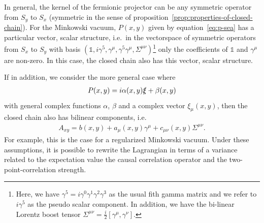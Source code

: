 \documentclass[reqno,11pt]{amsart}
\numberwithin{equation}{section}
\begin{document}
In general, the kernel of the fermionic projector can be any symmetric operator from $S_y$ to $S_x$ (symmetric in the sense of
proposition~\ref{prop:properties-of-closed-chain}).
For the Minkowski vacuum, $P(x, y)$ given by equation~\eqref{eq:p-sea} has a particular vector, scalar structure,
i.e.~in the vectorspace of symmetric operators from $S_x$ to $S_y$ with basis $(\mathbb{1}, i \gamma^5, \gamma^\mu, \gamma^5 \gamma^\mu, \Sigma^{\mu\nu})$\footnote{
    Here, we have $\gamma^5 = i \gamma^0 \gamma^1 \gamma^2 \gamma^3$ as the usual fith gamma matrix and we refer to $i \gamma^5$
    as the pseudo scalar component.
    In addition, we have the bi-linear Lorentz boost tensor $\Sigma^{\mu\nu} = \frac{i}{2} \left[ \gamma^\mu, \gamma^\nu \right]$.
}
only the coefficients of $\mathbb{1}$ and $\gamma^\mu$ are non-zero.
In this case, the closed chain also has this vector, scalar structure.

If in addition, we consider the more general case where
\begin{align} \label{eq:general-vector-scalar-structure}
    P(x, y) = i \alpha(x, y) \slashed{\xi} + \beta(x, y)
\end{align}
with general complex functions $\alpha$, $\beta$ and a complex vector $\xi_\mu(x, y)$, then the closed chain also has
bilinear components, i.e.
\begin{align} \label{eq:closed-chain-vector-scalar-decomposition}
    A_{xy} = b(x, y) + a_\mu(x, y) \gamma^\mu + c_{\mu\nu}(x, y) \Sigma^{\mu\nu}.
\end{align}
For example, this is the case for a regularized Minkowski vacuum.
Under these assumptions, it is possible to rewrite the Lagrangian in terms of a variance related to the expectation value
the causal correlation operator and the two-point-correlation strength.
\end{document}
